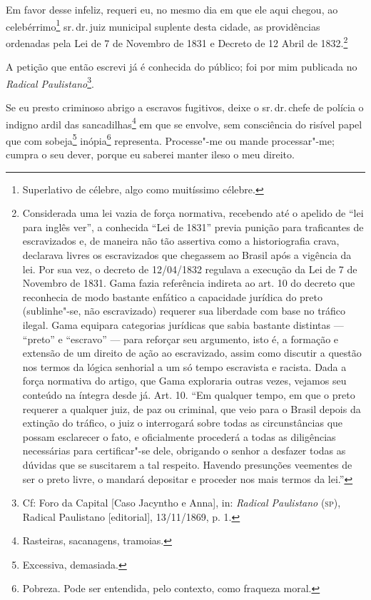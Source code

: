 Em favor desse infeliz, requeri eu, no mesmo dia em que ele aqui chegou,
ao celebérrimo\footnote{Superlativo de célebre, algo como muitíssimo \label{celebre}
  célebre.} sr.\,dr.\,juiz municipal suplente desta cidade, as
providências ordenadas pela Lei de 7 de Novembro de 1831 e Decreto de 12
Abril de 1832.\footnote{Considerada uma lei vazia de força normativa,
  recebendo até o apelido de ``lei para inglês ver'', a conhecida ``Lei de
  1831'' previa punição para traficantes de escravizados e, de maneira
  não tão assertiva como a historiografia crava, declarava livres os
  escravizados que chegassem ao Brasil após a vigência da lei. Por sua
  vez, o decreto de 12/04/1832 regulava a execução da Lei de 7 de
  Novembro de 1831. Gama fazia referência indireta ao art.
  10 do decreto que reconhecia de modo bastante enfático a capacidade
  jurídica do preto (sublinhe"-se, não escravizado) requerer sua
  liberdade com base no tráfico ilegal. Gama equipara categorias
  jurídicas que sabia bastante distintas --- ``preto'' e ``escravo'' --- para
  reforçar seu argumento, isto é, a formação e extensão de um direito de
  ação ao escravizado, assim como discutir a questão nos termos da
  lógica senhorial a um só tempo escravista e racista. Dada a força
  normativa do artigo, que Gama exploraria outras vezes, vejamos seu conteúdo na
  íntegra desde já. Art. 10. ``Em qualquer tempo, em que o preto requerer
  a qualquer juiz, de paz ou criminal, que veio para o Brasil depois da
  extinção do tráfico, o juiz o interrogará sobre todas as
  circunstâncias que possam esclarecer o fato, e oficialmente procederá
  a todas as diligências necessárias para certificar"-se dele, obrigando
  o senhor a desfazer todas as dúvidas que se suscitarem a tal respeito.
  Havendo presunções veementes de ser o preto livre, o mandará depositar
  e proceder nos mais termos da lei.''}

A petição que então escrevi já é conhecida do público; foi por mim
publicada no \emph{Radical Paulistano}\footnote{Cf: Foro da Capital
  {[}Caso Jacyntho e Anna{]}, in: \emph{Radical Paulistano} (\textsc{sp}),
  Radical Paulistano {[}editorial{]}, 13/11/1869, p. 1.}.


Se eu presto criminoso abrigo a escravos fugitivos, deixe o sr.\,dr.\,chefe de polícia o indigno ardil das sancadilhas\footnote{Rasteiras,
  sacanagens, tramoias.} em que se envolve, sem consciência do risível
papel que com sobeja\footnote{Excessiva, demasiada.} inópia\footnote{
  Pobreza. Pode ser entendida, pelo contexto, como fraqueza moral.}
representa. Processe"-me ou mande processar"-me; cumpra o seu dever,
porque eu saberei manter ileso o meu direito.

